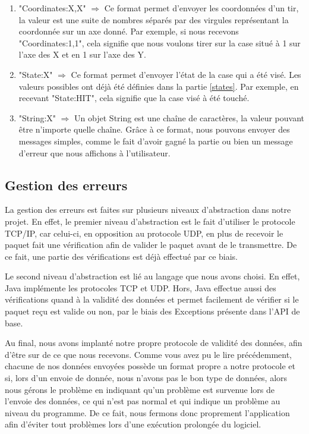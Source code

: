 			\begin{enumerate}
				\item "Coordinates:X,X" $\Rightarrow$ Ce format permet d'envoyer les coordonnées d'un tir, la valeur est une suite de nombres séparés par des virgules représentant la coordonnée sur un axe donné. Par exemple, si nous recevons "Coordinates:1,1", cela signifie que nous voulons tirer sur la case situé à 1 sur l'axe des X et en 1 sur l'axe des Y.
			 
				\item "State:X" $\Rightarrow$ Ce format permet d'envoyer l'état de la case qui a été visé. Les valeurs possibles ont déjà été définies dans la partie \ref{states}. Par exemple, en recevant "State:HIT", cela signifie que la case visé à été touché.
				
				\item "String:X" $\Rightarrow$ Un objet String est une chaîne de caractères, la valeur pouvant être n'importe quelle chaîne. Grâce à ce format, nous pouvons envoyer des messages simples, comme le fait d'avoir gagné la partie ou bien un message d'erreur que nous affichons à l'utilisateur. 
				
			\end{enumerate}
			

\subsection{Gestion des erreurs}
	La gestion des erreurs est faites sur plusieurs niveaux d'abstraction dans notre projet. En effet, le premier niveau d'abstraction est le fait d'utiliser le protocole TCP/IP, car celui-ci, en opposition au protocole UDP, en plus de recevoir le paquet fait une vérification afin de valider le paquet avant de le transmettre. De ce fait, une partie des vérifications est déjà effectué par ce biais.\newline
	
	Le second niveau d'abstraction est lié au langage que nous avons choisi. En effet, Java implémente les protocoles TCP et UDP. Hors, Java effectue aussi des vérifications quand à la validité des données et permet facilement de vérifier si le paquet reçu est valide ou non, par le biais des Exceptions présente dans l'API de base.\newline
	
	Au final, nous avons implanté notre propre protocole de validité des données, afin d'être sur de ce que nous recevons. Comme vous avez pu le lire précédemment, chacune de nos données envoyées possède un format propre a notre protocole et si, lors d'un envoie de donnée, nous n'avons pas le bon type de données, alors nous gérons le problème en indiquant qu'un problème est survenue lors de l'envoie des données, ce qui n'est pas normal et qui indique un problème au niveau du programme. De ce fait, nous fermons donc proprement l'application afin d'éviter tout problèmes lors d'une exécution prolongée du logiciel.

